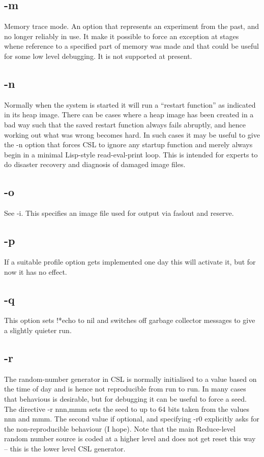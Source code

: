 \documentclass[a4paper,11pt]{article}
\begin{document}
\subsection{\ttfamily -m}
   Memory trace mode. An option that represents an experiment from the past,
   and no longer reliably in use. It make it possible to force an
   exception at stages whene reference to a specified part of memory was made
   and that could be useful for some low level debugging. It is not supported
   at present.

\subsection{\ttfamily -n}
   Normally when the system is started it will run a ``restart function'' as
   indicated in its heap image. There can be cases where a heap image has been
   created in a bad way such that the saved restart function always fails
   abruptly, and hence working out what was wrong becomes hard. In such cases
   it may be useful to give the {\ttfamily -n} option that forces CSL to
   ignore any startup function and merely always begin in a minimal Lisp-style
   read-eval-print loop. This is intended for experts to do disaster recovery
   and diagnosis of damaged image files.

\subsection{\ttfamily -o}
   See {\ttfamily -i}. This specifies an image file used for output via
{\ttfamily faslout} and {\ttfamily reserve}.

\subsection{\ttfamily -p}
   If a suitable profile option gets implemented one day this will activate it,
   but for now it has no effect.

\subsection{\ttfamily -q}
   This option sets {\ttfamily !*echo} to {\ttfamily nil} and switches off
   garbage collector messages to give a slightly quieter run.

\subsection{\ttfamily -r}
   The random-number generator in CSL is normally initialised to a value
   based on the time of day and is hence not reproducible from run to run.
   In many cases that behavious is desirable, but for debugging it can be useful
   to force a seed. The directive {\ttfamily -r nnn,mmm} sets the seed to
   up to 64 bits taken from the values nnn and mmm. The second value if optional,
   and specifying {\ttfamily -r0}  explicitly asks for the non-reproducible
   behaviour (I hope). Note that the main Reduce-level random number source is
   coded at a higher level and does not get reset this way -- this is the
   lower level CSL generator.
\end{document}
